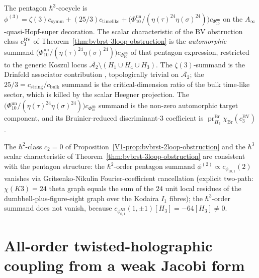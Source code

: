 \begin{remark}[Compatibility with the pentagon $\hbar^3$ cocycle
$\phi^{(3)} = \zeta(3) c_{\mathrm{symm}} + (25/3) c_{\mathrm{timelike}}
 + \bigl(\Phi_{10}^{\mathrm{un}}/(\eta(\tau)^{24}\eta(\sigma)^{24})\bigr)c_{\Phi_{10}^{\mathrm{un}}}$]
\label{rem:bvbrst-3loop-pentagon-consistency}
The pentagon $\hbar^3$-cocycle is
$\phi^{(3)} = \zeta(3) c_{\mathrm{symm}} + (25/3) c_{\mathrm{timelike}}
+ \bigl(\Phi_{10}^{\mathrm{un}}/(\eta(\tau)^{24}\eta(\sigma)^{24})\bigr)c_{\Phi_{10}^{\mathrm{un}}}$ on the $A_\infty$-quasi-Hopf-super
decoration. The scalar characteristic of the BV obstruction class
\(c_3^{\mathrm{BV}}\) of
Theorem~\ref{thm:bvbrst-3loop-obstruction} is the \emph{automorphic}
summand
\(\bigl(\Phi_{10}^{\mathrm{un}}/(\eta(\tau)^{24}\eta(\sigma)^{24})\bigr)c_{\Phi_{10}^{\mathrm{un}}}\) of that pentagon expression,
restricted to the generic Koszul locus
$\overline{\mathcal{A}_2}\setminus (H_1\cup H_4\cup H_3)$. The
$\zeta(3)$-summand is the Drinfeld associator contribution
\cite[Thm.~A]{Drinfeld1991}, topologically trivial on
$\overline{\mathcal{A}_2}$; the $25/3 = c_{\mathrm{string}}/c_{\mathrm{bulk}}$
summand is the critical-dimension ratio of the bulk time-like sector,
which is killed by the scalar Heegner projection. The
\(\bigl(\Phi_{10}^{\mathrm{un}}/(\eta(\tau)^{24}\eta(\sigma)^{24})\bigr)c_{\Phi_{10}^{\mathrm{un}}}\) summand
is the non-zero automorphic target component, and its Bruinier-reduced
discriminant-$3$ coefficient is
\(\operatorname{pr}_{H_3}^{\mathrm{Br}}\chi_{\mathrm{Br}}(c_3^{\mathrm{BV}})\).

The $\hbar^2$-class \(c_2=0\) of
Proposition~\ref{V1-prop:bvbrst-2loop-obstruction} and the
$\hbar^3$ scalar characteristic of
Theorem~\ref{thm:bvbrst-3loop-obstruction} are consistent with the
pentagon structure: the $\hbar^2$-order pentagon summand
$\phi^{(2)} \propto c_{\phi_{10,1}}(2)$ vanishes via
Gritsenko-Nikulin Fourier-coefficient cancellation (explicit two-path:
\(\chi(K3)=24\) theta graph equals the sum of the \(24\) unit local
residues of the dumbbell-plus-figure-eight graph over the Kodaira
\(I_1\) fibres); the $\hbar^3$-order summand does not vanish, because
	\(c_{\phi_{0,1}^{K3}}(1,\pm1)[H_3] = -64[H_3] \neq 0\).
\end{remark}

\section{All-order twisted-holographic coupling from a weak Jacobi form}
\label{sec:vol2-bvbrst-heegner-all-order}

